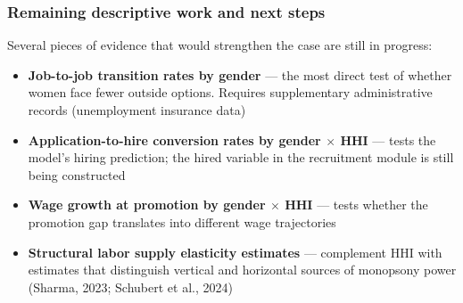 \documentclass[aspectratio=169, 11pt]{beamer}
\begin{document}
\begin{frame}
\frametitle{Remaining descriptive work and next steps}

Several pieces of evidence that would strengthen the case are still in progress:

\vspace{0.3cm}
\begin{itemize}
    \item \textbf{Job-to-job transition rates by gender} --- the most direct test of whether women face fewer outside options. Requires supplementary administrative records (unemployment insurance data)

    \medskip
    \item \textbf{Application-to-hire conversion rates by gender $\times$ HHI} --- tests the model's hiring prediction; the hired variable in the recruitment module is still being constructed

    \medskip
    \item \textbf{Wage growth at promotion by gender $\times$ HHI} --- tests whether the promotion gap translates into different wage trajectories

    \medskip
    \item \textbf{Structural labor supply elasticity estimates} --- complement HHI with estimates that distinguish vertical and horizontal sources of monopsony power (Sharma, 2023; Schubert et al., 2024)
\end{itemize}

\end{frame}



\appendix
{} %
\end{document}
